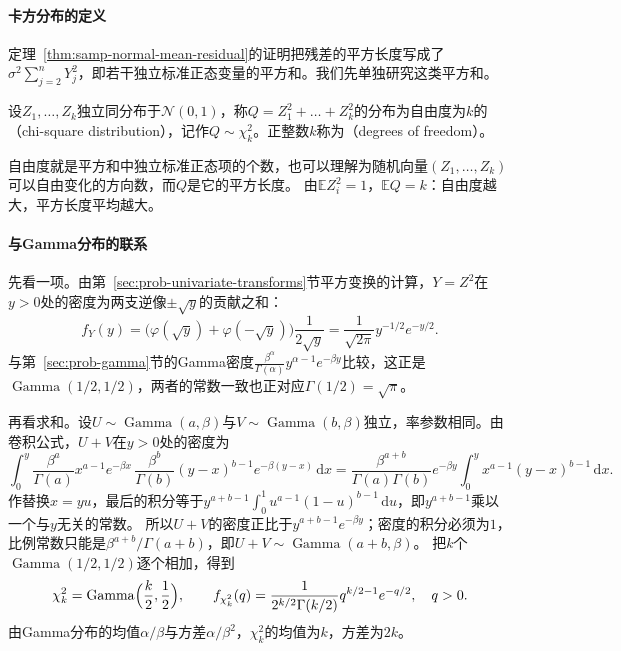 \paragraph{卡方分布的定义}
定理~\ref{thm:samp-normal-mean-residual}的证明把残差的平方长度写成了$\sigma^2\sum_{j=2}^nY_j^2$，即若干独立标准正态变量的平方和。我们先单独研究这类平方和。

\begin{definition}[卡方分布]
\label{def:samp-chi-square}
设$Z_1,\dots,Z_k$独立同分布于$\mathcal N(0,1)$，称$Q=Z_1^2+\dots+Z_k^2$的分布为自由度为$k$的（chi-square distribution），记作$Q\sim\chi^2_k$。正整数$k$称为（degrees of freedom）。
\end{definition}

自由度就是平方和中独立标准正态项的个数，也可以理解为随机向量$(Z_1,\dots,Z_k)$可以自由变化的方向数，而$Q$是它的平方长度。
由$\mathbb{E}Z_i^2=1$，$\mathbb{E}Q=k$：自由度越大，平方长度平均越大。

\paragraph{与Gamma分布的联系}
先看一项。由第~\ref{sec:prob-univariate-transforms}节平方变换的计算，$Y=Z^2$在$y>0$处的密度为两支逆像$\pm\sqrt y$的贡献之和：
\[
  f_Y(y)=\bigl(\varphi(\sqrt y)+\varphi(-\sqrt y)\bigr)\frac{1}{2\sqrt y}=\frac{1}{\sqrt{2\pi}}y^{-1/2}e^{-y/2}.
\]
与第~\ref{sec:prob-gamma}节的Gamma密度$\frac{\beta^\alpha}{\Gamma(\alpha)}y^{\alpha-1}e^{-\beta y}$比较，这正是$\operatorname{Gamma}(1/2,1/2)$，两者的常数一致也正对应$\Gamma(1/2)=\sqrt\pi$。

再看求和。设$U\sim\operatorname{Gamma}(a,\beta)$与$V\sim\operatorname{Gamma}(b,\beta)$独立，率参数相同。由卷积公式，$U+V$在$y>0$处的密度为
\[
  \int_0^y\frac{\beta^a}{\Gamma(a)}x^{a-1}e^{-\beta x}\,\frac{\beta^b}{\Gamma(b)}(y-x)^{b-1}e^{-\beta(y-x)}\,\mathrm{d}x
  =\frac{\beta^{a+b}}{\Gamma(a)\Gamma(b)}e^{-\beta y}\int_0^yx^{a-1}(y-x)^{b-1}\,\mathrm{d}x.
\]
作替换$x=yu$，最后的积分等于$y^{a+b-1}\int_0^1u^{a-1}(1-u)^{b-1}\,\mathrm{d}u$，即$y^{a+b-1}$乘以一个与$y$无关的常数。
所以$U+V$的密度正比于$y^{a+b-1}e^{-\beta y}$；密度的积分必须为$1$，比例常数只能是$\beta^{a+b}/\Gamma(a+b)$，即$U+V\sim\operatorname{Gamma}(a+b,\beta)$。
把$k$个$\operatorname{Gamma}(1/2,1/2)$逐个相加，得到
\begin{equation}
  \chi^2_k=\operatorname{Gamma}\Bigl(\frac k2,\frac12\Bigr),\qquad
  f_{\chi^2_k}(q)=\frac{1}{2^{k/2}\Gamma(k/2)}q^{k/2-1}e^{-q/2},\quad q>0.
  \label{eq:samp-chi-square-density}
\end{equation}
由Gamma分布的均值$\alpha/\beta$与方差$\alpha/\beta^2$，$\chi^2_k$的均值为$k$，方差为$2k$。

